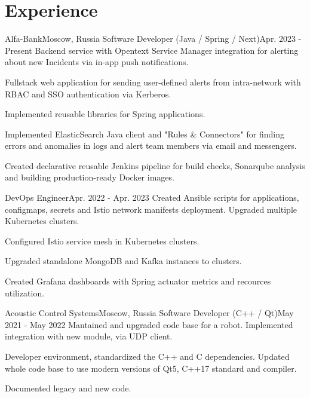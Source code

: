 

\section{Experience}\label{sec:experience}
\resumeSubHeadingListStart

\resumeSubheading
{Alfa-Bank}{Moscow, Russia}
    {Software Developer (Java / Spring / Next)}{Apr. 2023 - Present}
    \resumeItemListStart
        {Backend service with Opentext Service Manager integration for alerting about new Incidents via in-app push notifications.}

        {Fullstack web application for sending user-defined alerts from intra-network with RBAC and SSO authentication via Kerberos.}

        {Implemented reusable libraries for Spring applications.}

        {Implemented ElasticSearch Java client and "Rules \& Connectors" for finding errors and anomalies in logs and alert team members via email and messengers.}

        {Created declarative reusable Jenkins pipeline for build checks, Sonarqube analysis and building production-ready Docker images.}
    \resumeItemListEnd

\resumeSubSubheading
{DevOps Engineer}{Apr. 2022 - Apr. 2023}
    \resumeItemListStart
        {Created Ansible scripts for applications, configmaps, secrets and Istio network manifests deployment. Upgraded multiple Kubernetes clusters.}

        {Configured Istio service mesh in Kubernetes clusters.}

        {Upgraded standalone MongoDB and Kafka instances to clusters.}

        {Created Grafana dashboards with Spring actuator metrics and recources utilization.}
    \resumeItemListEnd

\resumeSubheading
{Acoustic Control Systems}{Moscow, Russia}
    {Software Developer (C++ / Qt)}{May 2021 - May 2022}
    \resumeItemListStart
        {Mantained and upgraded code base for a robot. Implemented integration with new module, via UDP client.}

        {Developer environment, standardized the C++ and C dependencies. Updated whole code base to use modern versions of Qt5, C++17 standard and compiler.}

        {Documented legacy and new code.}
    \resumeItemListEnd
\resumeSubHeadingListEnd